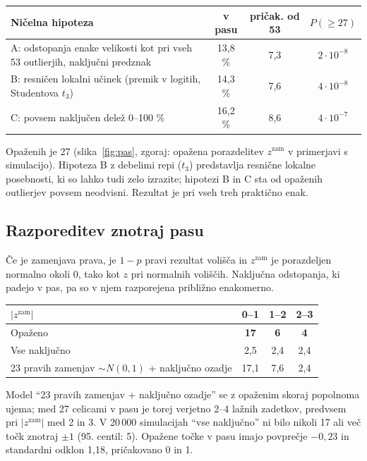 \documentclass[11pt,a4paper]{article}
\begin{document}
\begin{center}
\small\begin{tabular}{p{7.6cm}ccc}
\toprule
Ničelna hipoteza & v pasu & pričak. od 53 & $P(\geq27)$ \\
\midrule
A: odstopanja enake velikosti kot pri vseh 53 outlierjih, naključni predznak & 13,8 \% & 7,3 & $2\cdot10^{-8}$ \\
B: resničen lokalni učinek (premik v logitih, Studentova $t_3$) & 14,3 \% & 7,6 & $4\cdot10^{-8}$ \\
C: povsem naključen delež 0--100 \% & 16,2 \% & 8,6 & $4\cdot10^{-7}$ \\
\bottomrule
\end{tabular}
\end{center}

Opaženih je 27 (slika~\ref{fig:pas}, zgoraj: opažena porazdelitev $z^{\text{zam}}$ v primerjavi s simulacijo). Hipoteza B z debelimi repi ($t_3$) predstavlja resnične lokalne posebnosti, ki so lahko tudi zelo izrazite; hipotezi B in C sta od opaženih outlierjev povsem neodvisni. Rezultat je pri vseh treh praktično enak.

\subsection{Razporeditev znotraj pasu}

Če je zamenjava prava, je $1-p$ pravi rezultat volišča in $z^{\text{zam}}$ je porazdeljen normalno okoli 0, tako kot $z$ pri normalnih voliščih. Naključna odstopanja, ki padejo v pas, pa so v njem razporejena približno enakomerno.

\begin{center}
\small\begin{tabular}{lccc}
\toprule
$|z^{\text{zam}}|$ & 0--1 & 1--2 & 2--3 \\
\midrule
Opaženo & \textbf{17} & \textbf{6} & \textbf{4} \\
Vse naključno & 2,5 & 2,4 & 2,4 \\
23 pravih zamenjav $\sim N(0,1)$ + naključno ozadje & 17,1 & 7,6 & 2,4 \\
\bottomrule
\end{tabular}
\end{center}

Model ``23 pravih zamenjav + naključno ozadje'' se z opaženim skoraj popolnoma ujema; med 27 celicami v pasu je torej verjetno 2--4 lažnih zadetkov, predvsem pri $|z^{\text{zam}}|$ med 2 in 3. V 20\,000 simulacijah ``vse naključno'' ni bilo nikoli 17 ali več točk znotraj $\pm1$ (95. centil: 5). Opažene točke v pasu imajo povprečje $-0{,}23$ in standardni odklon 1,18, pričakovano 0 in 1.
\end{document}
